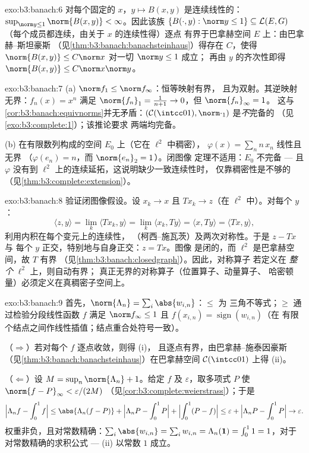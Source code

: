 \begin{solution}{exo:b3:banach:6}
对每个固定的 $x$，$y \mapsto B(x, y)$ 是连续线性的：
$\sup_{\norm y \leq 1}\norm{B(x,y)} < \infty$。因此该族
$\{B(\cdot, y) : \norm y \leq 1\} \subseteq \mathcal L(E, G)$
（每个成员都连续，由关于 $x$ 的连续性得）逐点
有界于巴拿赫空间 $E$ 上：由巴拿赫–斯坦豪斯
（见\cref{thm:b3:banach:banachsteinhaus}）得存在 $C$，使得
$\norm{B(x,y)} \leq C\norm x$ 对一切 $\norm y \leq 1$ 成立；
再由 $y$ 的齐次性即得 $\norm{B(x,y)} \leq
C\norm x\norm y$。
\end{solution}

\begin{solution}{exo:b3:banach:7}
(a) $\norm f_1 \leq \norm f_\infty$：恒等映射有界，
且为双射。其逆映射无界：$f_n(x) = x^n$ 满足
$\norm{f_n}_1 = \frac1{n+1} \to 0$，但 $\norm{f_n}_\infty = 1$。
这与\cref{cor:b3:banach:equivnorms}并无矛盾：$(\mathcal
C(\intcc01), \norm\cdot_1)$ 是\emph{不}完备的
（见\cref{exo:b3:complete:1}）；该推论要求
两端均完备。

(b) 在有限数列构成的空间 $E_0$ 上（它在 $\ell^2$ 中稠密），
$\varphi(x) = \sum_n n\,x_n$ 线性且无界
（$\varphi(e_n) = n$，而 $\norm{e_n}_2 = 1$）。闭图像
定理不适用：$E_0$ 不完备 --- 且 $\varphi$
没有到 $\ell^2$ 上的连续延拓，这说明缺少一致连续性时，
仅靠稠密性是不够的
（见\cref{thm:b3:complete:extension}）。
\end{solution}

\begin{solution}{exo:b3:banach:8}
验证闭图像假设。设 $x_k \to x$ 且
$Tx_k \to z$（在 $\ell^2$ 中）。对每个 $y$：
\[
\langle z, y\rangle = \lim_k\langle Tx_k, y\rangle
= \lim_k \langle x_k, Ty\rangle = \langle x, Ty\rangle
= \langle Tx, y\rangle,
\]
利用内积在每个变元上的连续性，
（柯西–施瓦茨）及两次对称性。于是 $z - Tx$ 与
每个 $y$ 正交，特别地与自身正交：$z = Tx$。图像
是闭的，而 $\ell^2$ 是巴拿赫空间，故 $T$ 有界
（见\cref{thm:b3:banach:closedgraph}）。因此，对称算子
若定义在 \emph{整个} $\ell^2$ 上，则自动有界；
真正无界的对称算子（位置算子、动量算子、
哈密顿量）必须定义在真稠密子空间上。
\end{solution}

\begin{solution}{exo:b3:banach:9}
首先，$\norm{\Lambda_n} = \sum_i\abs{w_{i,n}}$：$\leq$ 为
三角不等式；$\geq$ 通过检验分段线性函数 $f$
满足 $\norm f_\infty \leq 1$ 且 $f(x_{i,n}) =
\operatorname{sign}(w_{i,n})$（在
有限个结点之间作线性插值；结点重合处符号一致）。

（$\Rightarrow$）若对每个 $f$ 逐点收敛，则得 (i)，
且逐点有界，由巴拿赫–施泰因豪斯
（见\cref{thm:b3:banach:banachsteinhaus}）在巴拿赫空间 $\mathcal
C(\intcc01)$ 上得 (ii)。

（$\Leftarrow$）设 $M = \sup_n\norm{\Lambda_n} + 1$。给定 $f$
及 $\varepsilon$，取多项式 $P$ 使 $\norm{f -
P}_\infty < \varepsilon/(2M)$
（见\cref{cor:b3:complete:weierstrass}）；于是
\[
\Bigl|\Lambda_n f - \int_0^1 f\Bigr|
\leq \abs{\Lambda_n(f - P)} + \Bigl|\Lambda_nP -
\int_0^1P\Bigr| + \Bigl|\int_0^1(P - f)\Bigr|
\leq \varepsilon + \Bigl|\Lambda_nP - \int_0^1P\Bigr| \to
\varepsilon .
\]
权重非负，且对常数精确：$\sum_i\abs{w_{i,n}}
= \sum_iw_{i,n} = \Lambda_n(\mathbf 1) = \int_0^1 1 = 1$，对于
对常数精确的求积公式 --- (ii) 以常数 $1$ 成立。
\end{solution}

